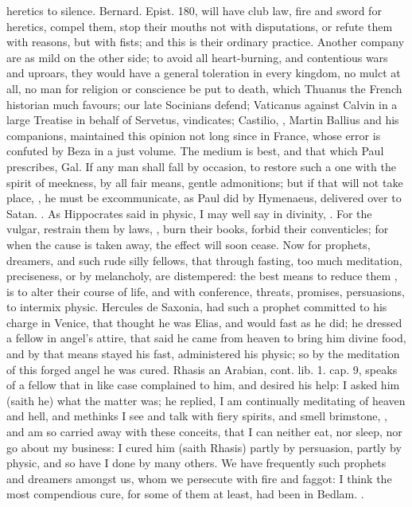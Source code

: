 {heretics to silence. Bernard. \textlatin{Epist. 180,} will have club law, fire and
sword for heretics, compel them, stop their mouths not with
disputations, or refute them with reasons, but with fists; and this is
their ordinary practice. Another company are as mild on the other side;
to avoid all heart-burning, and contentious wars and uproars, they
would have a general toleration in every kingdom, no mulct at all, no
man for religion or conscience be put to death, which Thuanus the
French historian much favours; our late Socinians defend; Vaticanus
against Calvin in a large Treatise in behalf of Servetus, vindicates;
Castilio, \etc{}, Martin Ballius and his companions, maintained this
opinion not long since in France, whose error is confuted by Beza in a
just volume. The medium is best, and that which Paul prescribes, Gal.
 If any man shall fall by occasion, to restore such a one with the
spirit of meekness, by all fair means, gentle admonitions; but if that
will not take place, , he must be excommunicate, as Paul did by Hymenaeus, delivered
over to Satan. . As Hippocrates
said in physic, I may well say in divinity, . For the vulgar, restrain them by laws, , burn their
books, forbid their conventicles; for when the cause is taken away, the
effect will soon cease. Now for prophets, dreamers, and such rude silly
fellows, that through fasting, too much meditation, preciseness, or by
melancholy, are distempered: the best means to reduce them , is to alter their course of life, and with conference, threats,
promises, persuasions, to intermix physic. Hercules de Saxonia, had
such a prophet committed to his charge in Venice, that thought he was
Elias, and would fast as he did; he dressed a fellow in angel's attire,
that said he came from heaven to bring him divine food, and by that
means stayed his fast, administered his physic; so by the meditation of
this forged angel he was cured. Rhasis an Arabian, \textlatin{cont. lib. 1.
cap. 9,} speaks of a fellow that in like case complained to him, and
desired his help: I asked him (saith he) what the matter was; he
replied, I am continually meditating of heaven and hell, and methinks I
see and talk with fiery spirits, and smell brimstone, \etc{}, and am so
carried away with these conceits, that I can neither eat, nor sleep,
nor go about my business: I cured him (saith Rhasis) partly by
persuasion, partly by physic, and so have I done by many others. We
have frequently such prophets and dreamers amongst us, whom we
persecute with fire and faggot: I think the most compendious cure, for
some of them at least, had been in Bedlam. .

}
